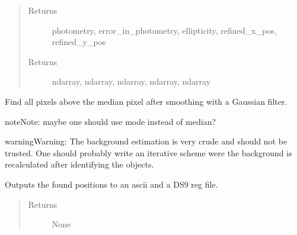 \documentclass[a4paper,12pt,english]{sphinxmanual}
\begin{document}
\begin{fulllineitems}
\begin{fulllineitems}
\begin{quote}
\begin{description}
\item[{Returns}] \leavevmode
photometry, error\_in\_photometry, ellipticity, refined\_x\_pos, refined\_y\_pos

\item[{Returns}] \leavevmode
ndarray, ndarray, ndarray, ndarray, ndarray

\end{description}\end{quote}

\end{fulllineitems}


\begin{fulllineitems}
\label{analysis:analysis.sourceFinder.sourceFinder.find}
Find all pixels above the median pixel after smoothing with a Gaussian filter.

\begin{notice}{note}{Note:}
maybe one should use mode instead of median?
\end{notice}

\begin{notice}{warning}{Warning:}
The background estimation is very crude and should not be trusted. One should probably write
an iterative scheme were the background is recalculated after identifying the objects.
\end{notice}

\end{fulllineitems}


\begin{fulllineitems}
\label{analysis:analysis.sourceFinder.sourceFinder.generateOutput}
Outputs the found positions to an ascii and a DS9 reg file.
\begin{quote}\begin{description}
\item[{Returns}] \leavevmode
None

\end{description}\end{quote}

\end{fulllineitems}



\end{fulllineitems}
\end{document}
